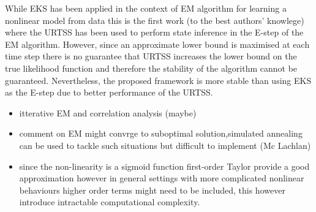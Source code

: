 \documentclass[]{article}
\begin{document}
While EKS has been  applied in the context of EM algorithm for learning a nonlinear model from data \cite{Ghahramani1999} this is the first work (to the best authors' knowlege) where the URTSS has been used to perform state inference in the E-step of the EM algorithm. However, since an approximate lower bound is maximised at each time step there is no guarantee that URTSS increases the lower bound on the true likelihood function and therefore the stability of the algorithm cannot be guaranteed. Nevertheless, the proposed framework is more stable than using EKS as the E-step due to better performance of the URTSS.
\begin{itemize}
	\item itterative EM and correlation analysis (maybe)
	\item{comment on EM might convrge to suboptimal solution,simulated
annealing can be used to tackle such situations but difficult to implement (Mc Lachlan)}
	\item{since the non-linearity is a sigmoid function first-order Taylor provide a good approximation however in general settings with more complicated nonlinear behaviours higher order terms might need to be included, this however introduce intractable computational complexity.}
\end{itemize}


\end{document}

